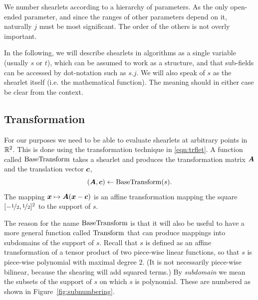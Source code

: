 We number shearlets according to a hierarchy of parameters. As the only open-ended parameter, and since the
ranges of other parameters depend on it, naturally $j$ must be most significant. The order of the others is
not overly important.

In the following, we will describe shearlets in algorithms as a single variable (usually $s$ or $t$), which
can be assumed to work as a structure, and that sub-fields can be accessed by dot-notation such as $s.j$. We
will also speak of $s$ as the shearlet itself (i.e. the mathematical function). The meaning should in either
case be clear from the context.

\subsection{Transformation} \label{sec:transformation}

For our purposes we need to be able to evaluate shearlets at arbitrary points in $\mathbb{R}^2$. This is done using
the transformation technique in \eqref{eqn:trflet}. A function called $\operatorname{BaseTransform}$ takes a shearlet and produces
the transformation matrix ${\bm A}$ and the translation vector ${\bm c}$,
\[ 
    ({\bm A},{\bm c}) \leftarrow \operatorname{BaseTransform}(s).
\]
The mapping ${\bm x} \mapsto {\bm A}({\bm x}-{\bm c})$ is an affine transformation mapping the square
$[-\nicefrac{1}{2},\nicefrac{1}{2}]^2$ to the support of $s$.

The reason for the name $\operatorname{BaseTransform}$ is that it will also be useful to have a more general function called
$\operatorname{Transform}$ that can produce mappings into subdomains of the support of $s$. Recall that $s$ is defined as an
affine transformation of a tensor product of two piece-wise linear functions, so that $s$ is piece-wise
polynomial with maximal degree $2$. (It is not necessarily piece-wise bilinear, because the shearing will add
squared terms.) By {\em subdomain} we mean the subsets of the support of $s$ on which $s$ is polynomial. These
are numbered as shown in Figure~\ref{fig:subnumbering}.

